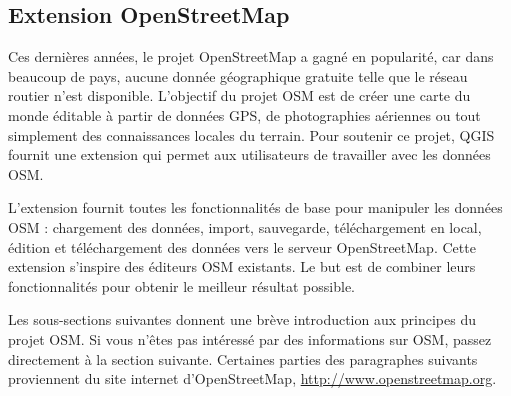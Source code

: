 
\subsection{Extension OpenStreetMap}


Ces dernières années, le projet OpenStreetMap a gagné en popularité, car dans beaucoup de pays, aucune donnée géographique gratuite telle que le réseau routier n'est disponible. L'objectif du projet OSM est de créer une carte du monde éditable à partir de données GPS, de photographies aériennes ou tout simplement des connaissances locales du terrain. Pour soutenir ce projet, QGIS fournit une extension qui permet aux utilisateurs de travailler avec les données OSM.

L'extension fournit toutes les fonctionnalités de base pour manipuler les données OSM : chargement des données, import, sauvegarde, téléchargement en local, édition et téléchargement des données vers le serveur OpenStreetMap. Cette extension s'inspire des éditeurs OSM existants. Le but est de combiner leurs fonctionnalités pour obtenir le meilleur résultat possible.

Les sous-sections suivantes donnent une brève introduction aux principes du projet OSM. Si vous n'êtes pas intéressé par des informations sur OSM, passez directement à la section suivante. Certaines parties des paragraphes suivants proviennent du site internet d'OpenStreetMap, \url{http://www.openstreetmap.org}.


